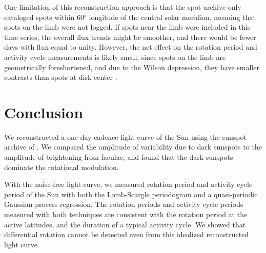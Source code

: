 One limitation of this reconstruction approach is that the \citet{Howard1984} spot archive only cataloged spots within 60$^\circ$ longitude of the central solar meridian, meaning that spots on the limb were not logged. If spots near the limb were included in this time series, the overall flux trends might be smoother, and there would be fewer days with flux equal to unity. However, the net effect on the rotation period and activity cycle measurements is likely small, since spots on the limb are geometrically foreshortened, and due to the Wilson depression, they have smaller contrasts than spots at disk center \citep{Solanki1993}. 

\section{Conclusion}

We reconstructed a one day-cadence light curve of the Sun using the sunspot archive of \citet{Howard1984}. We compared the amplitude of variability due to dark sunspots to the amplitude of brightening from faculae, and found that the dark sunspots dominate the rotational modulation.

With the noise-free light curve, we measured rotation period and activity cycle period of the Sun with both the Lomb-Scargle periodogram and a quasi-periodic Gaussian process regression. The rotation periods and activity cycle periods measured with both techniques are consistent with the rotation period at the active latitudes, and the duration of a typical activity cycle. We showed that differential rotation cannot be detected even from this idealized reconstructed light curve.

%
%
%
%
%
%
%
%
%